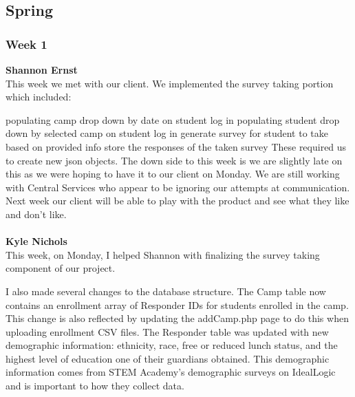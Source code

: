 \documentclass[../final.tex]{subfiles}
\begin{document}
\subsection{Spring}
\subsubsection{Week 1}
\textbf{Shannon Ernst} \\ 
This week we met with our client. We implemented the survey taking portion which included:

populating camp drop down by date on student log in
populating student drop down by selected camp on student log in
generate survey for student to take based on provided info
store the responses of the taken survey These required us to create new json objects. The down side to this week is we are slightly late on this as we were hoping to have it to our client on Monday. We are still working with Central Services who appear to be ignoring our attempts at communication. Next week our client will be able to play with the product and see what they like and don't like.\\ \\
\textbf{Kyle Nichols}\\
This week, on Monday, I helped Shannon with finalizing the survey taking component of our project.

I also made several changes to the database structure. The Camp table now contains an enrollment array of Responder IDs for students enrolled in the camp. This change is also reflected by updating the addCamp.php page to do this when uploading enrollment CSV files. The Responder table was updated with new demographic information: ethnicity, race, free or reduced lunch status, and the highest level of education one of their guardians obtained. This demographic information comes from STEM Academy's demographic surveys on IdealLogic and is important to how they collect data.
\end{document}
